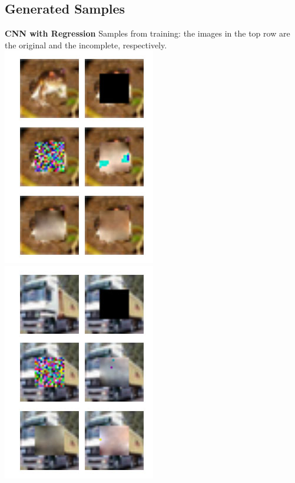 \documentclass[10pt,twocolumn,letterpaper]{article}
\begin{document}
\subsection{Generated Samples}
\textbf{CNN with Regression}
Samples from training: the images in the top row are the original and the incomplete, respectively. \\
\includegraphics[width=0.8\linewidth]{baseline_train_frog.jpg} 
\includegraphics[width=0.8\linewidth]{baseline_train_truck.jpg} 
\end{document}

